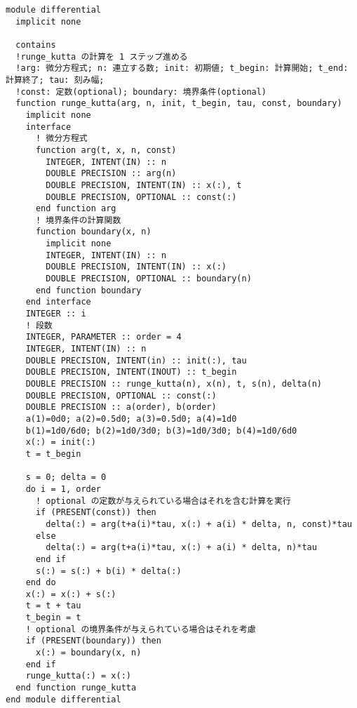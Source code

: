 \begin{lstlisting}[caption=Runge-Kutta関数のソースコード,label=srcRK4]
module differential
  implicit none
    
  contains
  !runge_kutta の計算を 1 ステップ進める
  !arg: 微分方程式; n: 連立する数; init: 初期値; t_begin: 計算開始; t_end: 計算終了; tau: 刻み幅;
  !const: 定数(optional); boundary: 境界条件(optional)
  function runge_kutta(arg, n, init, t_begin, tau, const, boundary)
    implicit none
    interface
      ! 微分方程式
      function arg(t, x, n, const)
        INTEGER, INTENT(IN) :: n
        DOUBLE PRECISION :: arg(n)
        DOUBLE PRECISION, INTENT(IN) :: x(:), t
        DOUBLE PRECISION, OPTIONAL :: const(:)
      end function arg
      ! 境界条件の計算関数
      function boundary(x, n)
        implicit none
        INTEGER, INTENT(IN) :: n
        DOUBLE PRECISION, INTENT(IN) :: x(:)
        DOUBLE PRECISION, OPTIONAL :: boundary(n)
      end function boundary
    end interface
    INTEGER :: i
    ! 段数
    INTEGER, PARAMETER :: order = 4
    INTEGER, INTENT(IN) :: n
    DOUBLE PRECISION, INTENT(in) :: init(:), tau
    DOUBLE PRECISION, INTENT(INOUT) :: t_begin
    DOUBLE PRECISION :: runge_kutta(n), x(n), t, s(n), delta(n)
    DOUBLE PRECISION, OPTIONAL :: const(:)
    DOUBLE PRECISION :: a(order), b(order)
    a(1)=0d0; a(2)=0.5d0; a(3)=0.5d0; a(4)=1d0
    b(1)=1d0/6d0; b(2)=1d0/3d0; b(3)=1d0/3d0; b(4)=1d0/6d0
    x(:) = init(:)
    t = t_begin

    s = 0; delta = 0
    do i = 1, order
      ! optional の定数が与えられている場合はそれを含む計算を実行
      if (PRESENT(const)) then 
        delta(:) = arg(t+a(i)*tau, x(:) + a(i) * delta, n, const)*tau
      else
        delta(:) = arg(t+a(i)*tau, x(:) + a(i) * delta, n)*tau
      end if
      s(:) = s(:) + b(i) * delta(:)
    end do
    x(:) = x(:) + s(:)
    t = t + tau
    t_begin = t
    ! optional の境界条件が与えられている場合はそれを考慮
    if (PRESENT(boundary)) then
      x(:) = boundary(x, n)
    end if
    runge_kutta(:) = x(:)
  end function runge_kutta
end module differential
\end{lstlisting}

